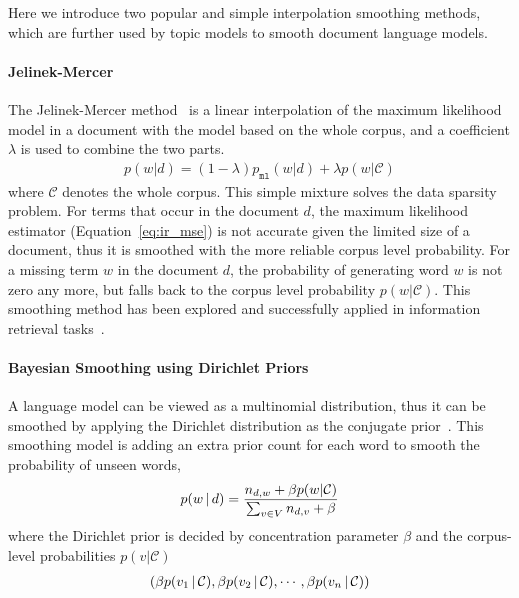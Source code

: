Here we introduce two popular and simple interpolation smoothing
methods, which are further used by topic models to smooth document
language models.

\paragraph{Jelinek-Mercer}

The Jelinek-Mercer method~\citep{Jelinek-1980} is a linear
interpolation of the maximum likelihood model in a document with the
model based on the whole corpus, and a coefficient $\lambda$ is used
to combine the two parts.
\begin{align}
p(w|d) = (1 - \lambda) p_{\texttt{ml}}(w|d) + \lambda p(w|\mathcal{C})
\label{eq:lm-jr}
\end{align}
where $\mathcal{C}$ denotes the whole corpus. This simple mixture
solves the data sparsity problem. For terms that occur in the document
$d$, the maximum likelihood estimator (Equation~\ref{eq:ir_mse}) is
not accurate given the limited size of a document, thus it is smoothed
with the more reliable corpus level probability. For a missing term $w$
in the document $d$, the probability of generating word $w$ is not zero any more, but falls
back to the corpus level probability $p(w|\mathcal{C})$.
This smoothing method has been explored and successfully applied in information retrieval tasks~\citep{PonteCroft,song-99}.

\paragraph{Bayesian Smoothing using Dirichlet Priors}

A language model can be viewed as a multinomial distribution, thus it
can be smoothed by applying the Dirichlet distribution as the
conjugate prior~\citep{mackay95dirichlet}. This smoothing model is
adding an extra prior count for each word to smooth the probability of
unseen words,
\begin{align}
p(w \, | \, d) = \frac{n_{d,w} + \beta p(w|\mathcal{C})}{\sum_{v \in V} n_{d,v} + \beta}
\end{align}
where the Dirichlet prior is decided by concentration parameter $\beta$ and the
corpus-level probabilities $p(v|\mathcal{C})$
\begin{align}
(\beta p(v_1 \, | \, \mathcal{C}), \beta p(v_2 \, | \, \mathcal{C}), \cdots, \beta p(v_n \, | \, \mathcal{C}))
\label{eq:lm-bs}
\end{align}

